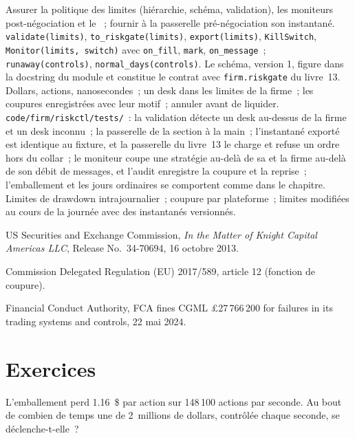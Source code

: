 \begin{build}
 Assurer la politique des limites (hiérarchie, schéma, validation), les moniteurs post-négociation et le ~; fournir à la passerelle pré-négociation
son instantané.
 \texttt{validate(limits)}, \texttt{to\_riskgate(limits)}, \texttt{export(limits)}, \texttt{KillSwitch},
\texttt{Monitor(limits, switch)} avec \texttt{on\_fill}, \texttt{mark}, \texttt{on\_message}~; \texttt{runaway(controls)}, \texttt{normal\_days(controls)}. Le schéma,
version 1, figure dans la docstring du module et constitue le contrat avec \texttt{firm.riskgate} du livre~13.
 Dollars, actions, nanosecondes~; un desk dans les limites de la firme~; les coupures enregistrées avec leur motif~; annuler avant de liquider.
 \texttt{code/firm/riskctl/tests/}~: la validation détecte un desk au-dessus de la firme et un desk inconnu~; la passerelle de la section à la main~;
l'instantané exporté est identique au fixture, et la passerelle du livre~13 le charge et refuse un ordre hors du collar~; le moniteur coupe une stratégie au-delà de sa 
et la firme au-delà de son débit de messages, et l'audit enregistre la coupure et la reprise~; l'emballement et les jours ordinaires se comportent comme dans le chapitre.
 Limites de drawdown intrajournalier~; coupure par plateforme~; limites modifiées au cours de la journée avec des instantanés versionnés.
\end{build}

\begin{omsources}
\item US Securities and Exchange Commission, \emph{In the Matter of Knight Capital Americas LLC}, Release No.\ 34-70694, 16 octobre 2013.
\item Commission Delegated Regulation (EU) 2017/589, article 12 (fonction de coupure).
\item Financial Conduct Authority, FCA fines CGML £27\,766\,200 for failures in its trading systems and controls, 22 mai 2024.
\end{omsources}

\section{Exercices}

\begin{exercise}[$\star$]\label{exo:hf:risk-controls:1}
L'emballement perd 1.16~\$ par action sur 148\,100 actions par seconde. Au bout de combien de temps une  de 2~millions de dollars, contrôlée chaque seconde, se déclenche-t-elle~?
\end{exercise}

